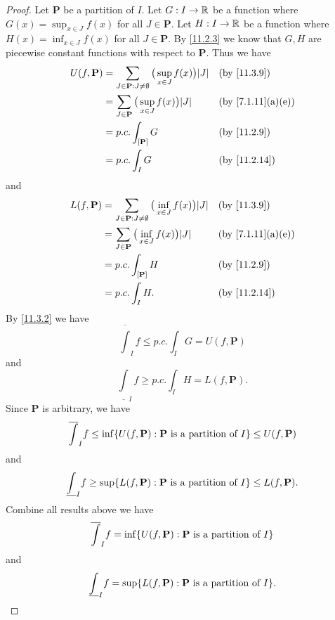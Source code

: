 \begin{proof}
  Let \(\mathbf{P}\) be a partition of \(I\).
  Let \(G : I \to \mathbb{R}\) be a function where \(G(x) = \sup_{x \in J} f(x)\) for all \(J \in \mathbf{P}\).
  Let \(H : I \to \mathbb{R}\) be a function where \(H(x) = \inf_{x \in J} f(x)\) for all \(J \in \mathbf{P}\).
  By \cref{11.2.3} we know that \(G, H\) are piecewise constant functions with respect to \(\mathbf{P}\).
  Thus we have
  \begin{align*}
    U(f, \mathbf{P}) & = \sum_{J \in \mathbf{P} : J \neq \emptyset} \big(\sup_{x \in J} f(x)\big) \abs{J} &  & \by{11.3.9}                     \\
                     & = \sum_{J \in \mathbf{P}} \big(\sup_{x \in J} f(x)\big) \abs{J}                    &  & \text{(by \cref{7.1.11}(a)(e))} \\
                     & = p.c. \int_{[\mathbf{P}]} G                                                       &  & \by{11.2.9}                     \\
                     & = p.c. \int_I G                                                                    &  & \by{11.2.14}
  \end{align*}
  and
  \begin{align*}
    L(f, \mathbf{P}) & = \sum_{J \in \mathbf{P} : J \neq \emptyset} \big(\inf_{x \in J} f(x)\big) \abs{J} &  & \by{11.3.9}                     \\
                     & = \sum_{J \in \mathbf{P}} \big(\inf_{x \in J} f(x)\big) \abs{J}                    &  & \text{(by \cref{7.1.11}(a)(e))} \\
                     & = p.c. \int_{[\mathbf{P}]} H                                                       &  & \by{11.2.9}                     \\
                     & = p.c. \int_I H.                                                                   &  & \by{11.2.14}
  \end{align*}
  By \cref{11.3.2} we have
  \[
    \overline{\int}_I f \leq p.c. \int_I G = U(f, \mathbf{P})
  \]
  and
  \[
    \underline{\int}_I f \geq p.c. \int_I H = L(f, \mathbf{P}).
  \]
  Since \(\mathbf{P}\) is arbitrary, we have
  \[
    \overline{\int}_I f \leq \inf\set{U(f, \mathbf{P}) : \mathbf{P} \text{ is a partition of } I} \leq U(f, \mathbf{P})
  \]
  and
  \[
    \underline{\int}_I f \geq \sup\set{L(f, \mathbf{P}) : \mathbf{P} \text{ is a partition of } I} \leq L(f, \mathbf{P}).
  \]
  Combine all results above we have
  \[
    \overline{\int}_I f = \inf\set{U(f, \mathbf{P}) : \mathbf{P} \text{ is a partition of } I}
  \]
  and
  \[
    \underline{\int}_I f = \sup\set{L(f, \mathbf{P}) : \mathbf{P} \text{ is a partition of } I}.
  \]
\end{proof}

